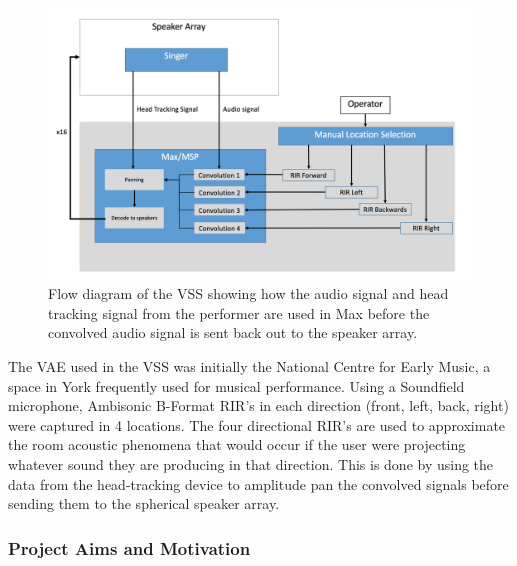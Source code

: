 \documentclass[../../main.tex]{subfiles}
\begin{document}
	
		\begin{figure}[H]
			\centerline{\includegraphics[scale = 0.45]{Sections/Background/images/vssDiagram.png}}
			\caption{Flow diagram of the VSS showing how the audio signal and head tracking signal from the performer are used in Max before the convolved audio signal is sent back out to the speaker array.}
			\label{vssDiagram}
		\end{figure}

		The \ac{VAE} used in the \ac{VSS} was initially the National Centre for Early Music, a space in York frequently used for musical performance. Using a Soundfield microphone, Ambisonic B-Format \ac{RIR}'s in each direction (front, left, back, right) were captured in 4 locations. The four directional \ac{RIR}'s are used to approximate the room acoustic phenomena that would occur if the user were projecting whatever sound they are producing in that direction. This is done by using the data from the head-tracking device to amplitude pan the convolved signals before sending them to the spherical speaker array.


	\subsubsection{Project Aims and Motivation}
	\label{background:aims}
		
\end{document}
